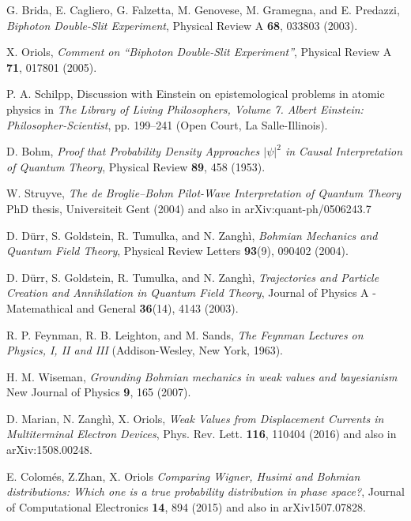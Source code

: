 \documentclass[nofootinbib, secnumarabic, amsmath, nobibnotes,10pt,aps,pra]{revtex4-1}
\begin{document}
\begin{thebibliography}{999}
G. Brida, E. Cagliero, G. Falzetta, M. Genovese, M. Gramegna, and E. Predazzi, \emph{Biphoton Double-Slit Experiment}, Physical Review A \textbf{68},  033803 (2003).

X. Oriols, \emph{Comment on ``Biphoton Double-Slit Experiment''}, Physical Review A \textbf{71},  017801 (2005).


P. A. Schilpp, Discussion with Einstein on epistemological problems in atomic physics in \emph{The Library of Living Philosophers, Volume 7. Albert Einstein: Philosopher-Scientist}, pp. 199--241 (Open Court, La Salle-Illinois).

D. Bohm, \emph{Proof that Probability Density Approaches $|\psi|^2$ in Causal Interpretation of Quantum Theory}, Physical Review \textbf{89},  458 (1953).

W. Struyve, \emph{The de Broglie--Bohm Pilot-Wave Interpretation of Quantum Theory} PhD thesis, Universiteit Gent (2004) and also in arXiv:quant-ph/0506243.7

D. D\"{u}rr, S. Goldstein, R. Tumulka, and N. Zangh\`i, \emph{Bohmian Mechanics and Quantum Field Theory}, Physical Review Letters \textbf{93}(9),  090402 (2004).

D. D\"{u}rr, S. Goldstein, R. Tumulka, and N. Zangh\`i, \emph{Trajectories and Particle Creation and Annihilation in Quantum Field Theory}, Journal of Physics A - Matemathical and General \textbf{36}(14),  4143 (2003).

 R. P. Feynman, R. B. Leighton, and M. Sands, \emph{The Feynman Lectures on Physics, I, II and III} (Addison-Wesley, New York, 1963).

H. M. Wiseman, \emph{Grounding Bohmian mechanics in weak values and bayesianism}  New Journal of Physics \textbf{9},   165 (2007). 

D. Marian, N. Zangh\`i, X. Oriols, \emph{Weak Values from Displacement Currents in Multiterminal Electron Devices}, Phys. Rev. Lett. {\bf 116},  110404 (2016) and also in arXiv:1508.00248.  

E. Colom\'{e}s, Z.Zhan, X. Oriols \emph{Comparing Wigner, Husimi and Bohmian distributions: Which one is a true probability distribution in phase space?}, Journal of Computational Electronics {\bf 14},  894 (2015) and also in arXiv1507.07828.  


\end{thebibliography}
\end{document}
